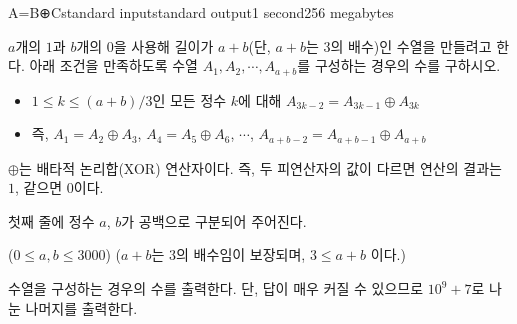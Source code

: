 \begin{problem}{A=B⊕C}{standard input}{standard output}{1 second}{256 megabytes}

$a$개의 $1$과 $b$개의 0을 사용해 길이가 $a+b$(단, $a+b$는 3의 배수)인 수열을 만들려고 한다. 아래 조건을 만족하도록 수열 $A_1, A_2, \cdots, A_{a+b}$를 구성하는 경우의 수를 구하시오.

\begin{itemize}
    \item $1 \le k \le (a+b)/3$인 모든 정수 $k$에 대해 $A_{3k-2} = A_{3k-1} \oplus A_{3k}$
    \item 즉, $A_1 = A_2 \oplus A_3$, $A_4 = A_5 \oplus A_6$, $\cdots$, $A_{a+b-2} = A_{a+b-1} \oplus A_{a+b}$
\end{itemize}

$\oplus$는 배타적 논리합(XOR) 연산자이다. 즉, 두 피연산자의 값이 다르면 연산의 결과는 $1$, 같으면 $0$이다.

\InputFile
첫째 줄에 정수 $a$, $b$가 공백으로 구분되어 주어진다.

($0 \le a, b \le 3000$) ($a + b$는 $3$의 배수임이 보장되며, $3 \le a + b$ 이다.)

\OutputFile
수열을 구성하는 경우의 수를 출력한다. 단, 답이 매우 커질 수 있으므로 $10^9+7$로 나눈 나머지를 출력한다.

\Examples

\begin{example}
%
%
%
\end{example}

\end{problem}

